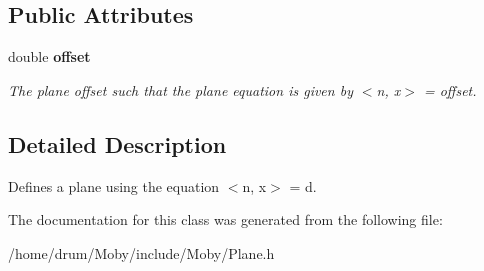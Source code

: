 \subsection*{Public Attributes}
\begin{DoxyCompactItemize}
\item 
double {\bf offset}\label{classMoby_1_1Plane_a3fdbe9871db062971473121a87b68194}

\begin{DoxyCompactList}\small\item\em The plane offset such that the plane equation is given by $<$n, x$>$ = offset. \end{DoxyCompactList}\end{DoxyCompactItemize}


\subsection{Detailed Description}
Defines a plane using the equation $<$n, x$>$ = d. 

The documentation for this class was generated from the following file\-:\begin{DoxyCompactItemize}
\item 
/home/drum/\-Moby/include/\-Moby/Plane.\-h\end{DoxyCompactItemize}
